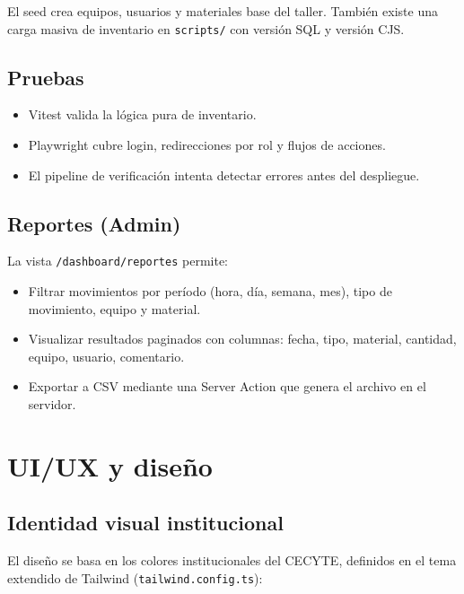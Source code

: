 \documentclass[12pt,a4paper,oneside]{report}
\newcommand{\file}[1]{\texttt{\color{cecyteDark}#1}}
\begin{document}
El seed crea equipos, usuarios y materiales base del taller. También existe una carga masiva de inventario en \file{scripts/} con versión SQL y versión CJS.

\section{Pruebas}

\begin{itemize}
  \item Vitest valida la lógica pura de inventario.
  \item Playwright cubre login, redirecciones por rol y flujos de acciones.
  \item El pipeline de verificación intenta detectar errores antes del despliegue.
\end{itemize}

\section{Reportes (Admin)}

La vista \file{/dashboard/reportes} permite:

\begin{itemize}
  \item Filtrar movimientos por período (hora, día, semana, mes), tipo de movimiento, equipo y material.
  \item Visualizar resultados paginados con columnas: fecha, tipo, material, cantidad, equipo, usuario, comentario.
  \item Exportar a CSV mediante una Server Action que genera el archivo en el servidor.
\end{itemize}

\chapter{UI/UX y diseño}

\section{Identidad visual institucional}

El diseño se basa en los colores institucionales del CECYTE, definidos en el tema extendido de Tailwind (\file{tailwind.config.ts}):
\end{document}
